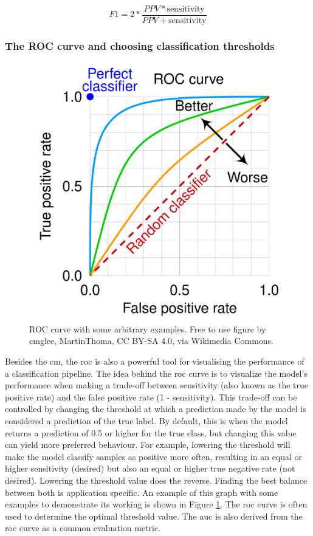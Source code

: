 \begin{equation}
    F1 = 2 * \frac{PPV * \text{sensitivity}}{PPV + \text{sensitivity}}
    \label{eq:processing_signals_f1}
\end{equation}


\subsubsection{The ROC curve and choosing classification thresholds}
\label{subsubsec:processing_signals_evaluating_and_using_evaluation_risk} 

\begin{figure}[t]
    \centering
    \includegraphics[width=0.6\linewidth]{../images/pipeline/ROC.pdf}
    \captionsetup{width=0.7\linewidth}
    \captionsetup{justification=centering}
    \caption{ROC curve with some arbitrary examples. Free to use figure by cmglee, MartinThoma, CC BY-SA 4.0, via Wikimedia Commons.}
    \label{fig:processing_signals_roc_explained}
\end{figure}

Besides the \gls{cm}, the \gls{roc} is also a powerful tool for visualising the performance of a classification pipeline.
The idea behind the \gls{roc} curve is to visualize the model's performance when making a trade-off between sensitivity (also known as the true positive rate) and the false positive rate (1 - sensitivity).
This trade-off can be controlled by changing the threshold at which a prediction made by the model is considered a prediction of the true label.
By default, this is when the model returns a prediction of 0.5 or higher for the true class, but changing this value can yield more preferred behaviour.
For example, lowering the threshold will make the model classify samples as positive more often, resulting in an equal or higher sensitivity (desired) but also an equal or higher true negative rate (not desired).
Lowering the threshold value does the reverse.
Finding the best balance between both is application specific.
An example of this graph with some examples to demonstrate its working is shown in Figure \ref{fig:processing_signals_roc_explained}.
The \gls{roc} curve is often used to determine the optimal threshold value.
The \gls{auc} is also derived from the \gls{roc} curve as a common evaluation metric.

